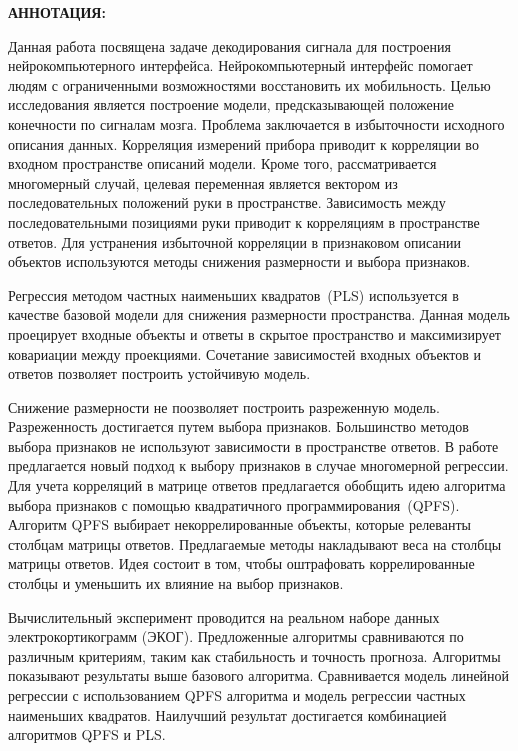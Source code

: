 \documentclass[12pt,oneside]{article}
\theoremstyle{definition}
\begin{document}
\setcounter{page}{2}
\begin{center}
	\textbf{АННОТАЦИЯ:} 
\end{center}

Данная работа посвящена задаче декодирования сигнала для построения нейрокомпьютерного интерфейса.
Нейрокомпьютерный интерфейс помогает людям с ограниченными возможностями восстановить их мобильность.
Целью исследования является построение модели, предсказывающей положение конечности по сигналам мозга. 
Проблема заключается в избыточности исходного описания данных. 
Корреляция измерений прибора приводит к корреляции во входном пространстве описаний модели. 
Кроме того, рассматривается многомерный случай, целевая переменная является вектором из последовательных положений руки в пространстве. 
Зависимость между последовательными позициями руки приводит к корреляциям в пространстве ответов.
Для устранения избыточной корреляции в признаковом описании объектов используются методы снижения размерности и выбора признаков.

Регрессия методом частных наименьших квадратов~(PLS) используется в качестве базовой модели для снижения размерности пространства.
Данная модель проецирует входные объекты и ответы в скрытое пространство и максимизирует ковариации между проекциями.
Сочетание зависимостей входных объектов и ответов позволяет построить устойчивую модель.

Снижение размерности не поозволяет построить разреженную модель. Разреженность достигается путем выбора признаков.
Большинство методов выбора признаков не используют зависимости в пространстве ответов.
В работе предлагается новый подход к выбору признаков в случае многомерной регрессии.
Для учета корреляций в матрице ответов предлагается обобщить идею алгоритма выбора признаков с помощью квадратичного программирования~(QPFS). 
Алгоритм QPFS выбирает некоррелированные объекты, которые релеванты столбцам матрицы ответов. 
Предлагаемые методы накладывают веса на столбцы матрицы ответов. 
Идея состоит в том, чтобы оштрафовать коррелированные столбцы и уменьшить их влияние на выбор признаков. 

Вычислительный эксперимент проводится на реальном наборе данных электрокортикограмм (ЭКОГ). 
Предложенные алгоритмы сравниваются по различным критериям, таким как стабильность и точность прогноза.
Алгоритмы показывают результаты выше базового алгоритма.
Сравнивается модель линейной регрессии с использованием QPFS алгоритма и модель регрессии частных наименьших квадратов.
Наилучший результат достигается комбинацией алгоритмов QPFS и PLS.
\end{document}
